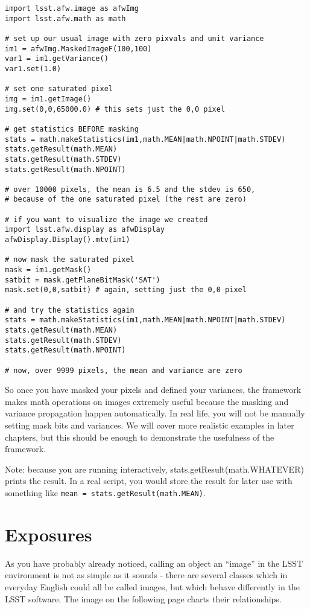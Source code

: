 \begin{verbatim}
import lsst.afw.image as afwImg
import lsst.afw.math as math

# set up our usual image with zero pixvals and unit variance
im1 = afwImg.MaskedImageF(100,100)
var1 = im1.getVariance()
var1.set(1.0)

# set one saturated pixel
img = im1.getImage()
img.set(0,0,65000.0) # this sets just the 0,0 pixel

# get statistics BEFORE masking
stats = math.makeStatistics(im1,math.MEAN|math.NPOINT|math.STDEV)
stats.getResult(math.MEAN)
stats.getResult(math.STDEV)
stats.getResult(math.NPOINT)

# over 10000 pixels, the mean is 6.5 and the stdev is 650,
# because of the one saturated pixel (the rest are zero)

# if you want to visualize the image we created
import lsst.afw.display as afwDisplay
afwDisplay.Display().mtv(im1)

# now mask the saturated pixel
mask = im1.getMask()
satbit = mask.getPlaneBitMask('SAT')
mask.set(0,0,satbit) # again, setting just the 0,0 pixel

# and try the statistics again
stats = math.makeStatistics(im1,math.MEAN|math.NPOINT|math.STDEV)
stats.getResult(math.MEAN)
stats.getResult(math.STDEV)
stats.getResult(math.NPOINT)

# now, over 9999 pixels, the mean and variance are zero
\end{verbatim}

So once you have masked your pixels and defined your variances, the
framework makes math operations on images extremely useful because
the masking and variance propagation happen automatically.  In real
life, you will not be manually setting mask bits and variances.  We
will cover more realistic examples in later chapters, but this should
be enough to demonstrate the usefulness of the framework.

Note: because you are running interactively,
stats.getResult(math.WHATEVER) prints the result.  In a real script,
you would store the result for later use with something like
\texttt{mean = stats.getResult(math.MEAN)}.


\section{Exposures}

As you have probably already noticed, calling an object an ``image''
in the LSST environment is not as simple as it sounds - there are
several classes which in everyday English could all be called images,
but which behave differently in the LSST software.  The image on the
following page charts their relationships.

